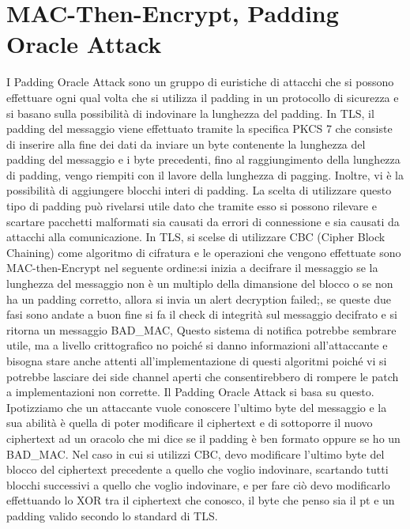 \documentclass{article}
\begin{document}
\section{MAC-Then-Encrypt, Padding Oracle Attack}
I Padding Oracle Attack sono un gruppo di euristiche di attacchi che si possono effettuare ogni qual volta che si utilizza il padding in un protocollo di sicurezza e si basano sulla possibilità di indovinare la lunghezza del padding\@.\newline
In TLS, il padding del messaggio viene effettuato tramite la specifica PKCS 7 che consiste di inserire alla fine dei dati da inviare un byte contenente la lunghezza del padding del messaggio e i byte precedenti, fino al raggiungimento della lunghezza di padding, vengo riempiti con il lavore della lunghezza di pagging\@.
Inoltre, vi è la possibilità di aggiungere blocchi interi di padding\@.\newline
La scelta di utilizzare questo tipo di padding può rivelarsi utile dato che tramite esso si possono rilevare e scartare pacchetti malformati sia causati da errori di connessione e sia causati da attacchi alla comunicazione\@.\newline
In TLS, si scelse di utilizzare CBC (Cipher Block Chaining) come algoritmo di cifratura e le operazioni che vengono effettuate sono MAC-then-Encrypt nel seguente ordine:\@prima si inizia a decifrare il messaggio se la lunghezza del messaggio non è un multiplo della dimansione del blocco o se non ha un padding corretto, allora si invia un alert decryption failed;\@inoltre, se queste due fasi sono andate a buon fine si fa il check di integrità sul messaggio decifrato e si ritorna un messaggio BAD\_MAC\@,\newline
Questo sistema di notifica potrebbe sembrare utile, ma a livello crittografico no poiché si danno informazioni all'attaccante e bisogna stare anche attenti all'implementazione di questi algoritmi poiché vi si potrebbe lasciare dei side channel aperti che consentirebbero di rompere le patch a implementazioni non corrette\@. Il Padding Oracle Attack si basa su questo\@.\newline
Ipotizziamo che un attaccante vuole conoscere l'ultimo byte del messaggio e la sua abilità è quella di poter modificare il ciphertext e di sottoporre il nuovo ciphertext ad un oracolo che mi dice se il padding è ben formato oppure se ho un BAD\_MAC\@.
Nel caso in cui si utilizzi CBC, devo modificare l'ultimo byte del blocco del ciphertext precedente a quello che voglio indovinare, scartando tutti blocchi successivi a quello che voglio indovinare, e per fare ciò devo modificarlo effettuando lo XOR tra il ciphertext che conosco, il byte che penso sia il pt e un padding valido secondo lo standard di TLS\@.
\end{document}

